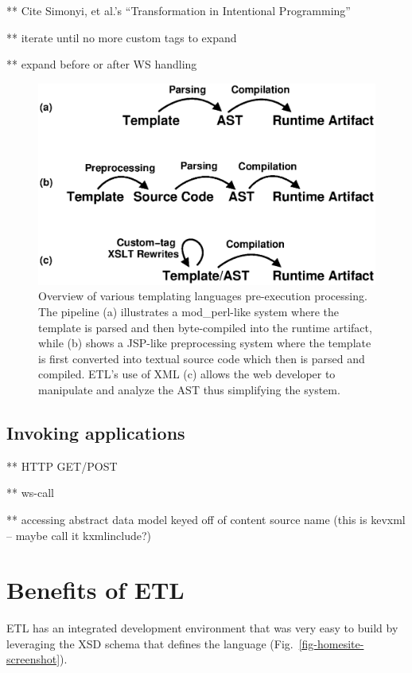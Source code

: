 \documentclass{www2003-submission}
\newcommand{\figref}[1]{Fig.~\ref{fig-#1}}
\begin{document}
** Cite Simonyi, et al.'s ``Transformation in Intentional Programming''

** iterate until no more custom tags to expand

** expand before or after WS handling



\begin{figure}[tb]
\begin{centering}
\includegraphics[width=.9\linewidth]{processing-stages-simple.eps}
\caption{Overview of various templating languages pre-execution
processing.  The pipeline (a) illustrates a mod\_perl-like system where
the template is parsed and then byte-compiled into the runtime
artifact, while (b) shows a JSP-like preprocessing system where the
template is first converted into textual source code which then is
parsed and compiled.  ETL's use of XML (c) allows the web developer to
manipulate and analyze the AST thus simplifying the system.
\label{fig-processing-stages}}
\end{centering}
\end{figure}


\subsection{Invoking applications}

** HTTP GET/POST

** ws-call

** accessing abstract data model keyed off of content source name
(this is kevxml -- maybe call it kxmlinclude?)


\section{Benefits of ETL}
\label{sec-benefits}

ETL has an integrated development environment that was very
easy to build by leveraging the XSD schema that defines the language
(\figref{homesite-screenshot}).
\end{document}

